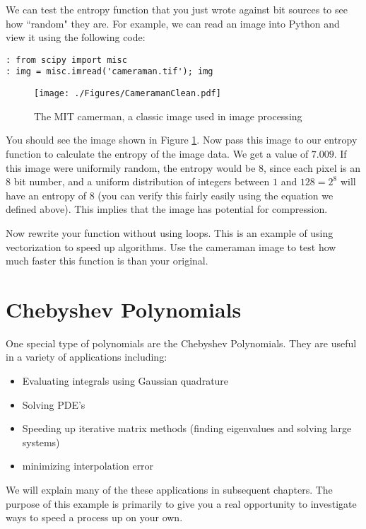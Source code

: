 We can test the entropy function that you just wrote against bit sources to see how ``random" they are. For example, we can read an image into Python and view it using the following code:
\begin{lstlisting}[style=python]
: from scipy import misc
: img = misc.imread('cameraman.tif'); img
\end{lstlisting}

\begin{figure}[h!]
\begin{center}
\texttt{[image: ./Figures/CameramanClean.pdf]}
\end{center}
\caption{The MIT camerman, a classic image used in image processing}
\label{fig:cameramanclean}
\end{figure}
You should see the image shown in Figure \ref{fig:cameramanclean}. Now pass this image to our entropy function to calculate the entropy of the image data. We get a value of $7.009$. If this image were uniformily random, the entropy would be $8$, since each pixel is an $8$ bit number, and a uniform distribution of integers between $1$ and $128 = 2^8$ will have an entropy of $8$ (you can verify this fairly easily using the equation we defined above). This implies that the image has potential for compression.

\begin{problem}
Now rewrite your function without using loops. This is an example of using vectorization to speed up algorithms. Use the cameraman image to test how much faster this function is than your original.
\end{problem}

\section*{Chebyshev Polynomials}

One special type of polynomials are the Chebyshev Polynomials. They are useful in a variety of applications including:
\begin{itemize}
\item Evaluating integrals using Gaussian quadrature
\item Solving PDE's
\item Speeding up iterative matrix methods (finding eigenvalues and solving large systems)
\item minimizing interpolation error
\end{itemize}

We will explain many of the these applications in subsequent chapters. The purpose of this example is primarily to give you a real opportunity to investigate ways to speed a process up on your own.

